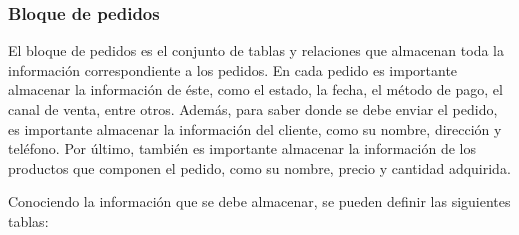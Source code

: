 \subsubsection{Bloque de pedidos}

El bloque de pedidos es el conjunto de tablas y relaciones que almacenan toda la información correspondiente a los pedidos. En cada pedido es importante almacenar la información de éste, como el estado, la fecha, el método de pago, el canal de venta, entre otros. Además, para saber donde se debe enviar el pedido, es importante almacenar la información del cliente, como su nombre, dirección y teléfono. Por último, también es importante almacenar la información de los productos que componen el pedido, como su nombre, precio y cantidad adquirida.

Conociendo la información que se debe almacenar, se pueden definir las siguientes tablas:

